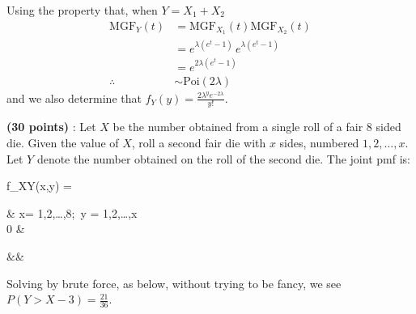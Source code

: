 \documentclass[12pt,letterpaper]{exam}
\begin{document}
\begin{questions}
	
	\begin{solution}
		Using the property that, when \(Y=X_1+X_2\)
		\begin{align*}
			\text{MGF}_Y(t) 
			&= \text{MGF}_{X_1}(t) \text{MGF}_{X_2}(t) \\
			&= e^{\lambda(e^t-1)} \, e^{\lambda(e^t-1)} \\
			&= e^{2\lambda(e^t-1)} \\ 
			\therefore&\sim\text{Poi}(2\lambda)
		\end{align*}
		and we also determine that \(f_Y(y) = \frac{2\lambda^ye^{-2\lambda}}{y!}\).
		
	\end{solution}
	
	\question 
	\textbf{(30 points)} : Let \(X\) be the number obtained from a single roll of a fair 8 sided die.
	Given the value of \(X\), roll a second fair die with \(x\) sides, numbered \(1,2,\ldots,x\).
	Let \(Y\) denote the number obtained on the roll of the second die.
	The joint pmf is:
	\begin{flalign*} \qquad
		f_{XY}(x,y) = \begin{cases}
			 & x= 1,2,\ldots,8;\ y = 1,2,\ldots,x \\
			0 & 
		\end{cases} &&
	\end{flalign*}
	
	
	\begin{solution}
		Solving by brute force, as below, without trying to be fancy, we see $P(Y>X-3) = \frac{21}{36}$.
		
	\end{solution}
		

\end{questions}
\end{document}
